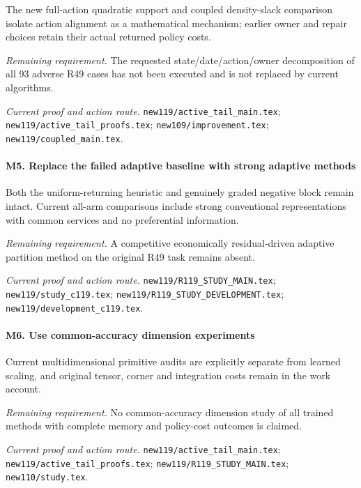 The new full-action quadratic support and coupled density-slack comparison isolate action alignment as a mathematical mechanism; earlier owner and repair choices retain their actual returned policy costs.

\par\emph{Remaining requirement.} The requested state/\allowbreak{}date/\allowbreak{}action/\allowbreak{}owner decomposition of all 93 adverse R49 cases has not been executed and is not replaced by current algorithms.

\par\emph{Current proof and action route.} \nolinkurl{new119/active_tail_main.tex}; \nolinkurl{new119/active_tail_proofs.tex}; \nolinkurl{new109/improvement.tex}; \nolinkurl{new119/coupled_main.tex}.

\paragraph{M5. Replace the failed adaptive baseline with strong adaptive methods}

Both the uniform-returning heuristic and genuinely graded negative block remain intact. Current all-arm comparisons include strong conventional representations with common services and no preferential information.

\par\emph{Remaining requirement.} A competitive economically residual-driven adaptive partition method on the original R49 task remains absent.

\par\emph{Current proof and action route.} \nolinkurl{new119/R119_STUDY_MAIN.tex}; \nolinkurl{new119/study_c119.tex}; \nolinkurl{new119/R119_STUDY_DEVELOPMENT.tex}; \nolinkurl{new119/development_c119.tex}.

\paragraph{M6. Use common-accuracy dimension experiments}

Current multidimensional primitive audits are explicitly separate from learned scaling, and original tensor, corner and integration costs remain in the work account.

\par\emph{Remaining requirement.} No common-accuracy dimension study of all trained methods with complete memory and policy-cost outcomes is claimed.

\par\emph{Current proof and action route.} \nolinkurl{new119/active_tail_main.tex}; \nolinkurl{new119/active_tail_proofs.tex}; \nolinkurl{new119/R119_STUDY_MAIN.tex}; \nolinkurl{new110/study.tex}.

